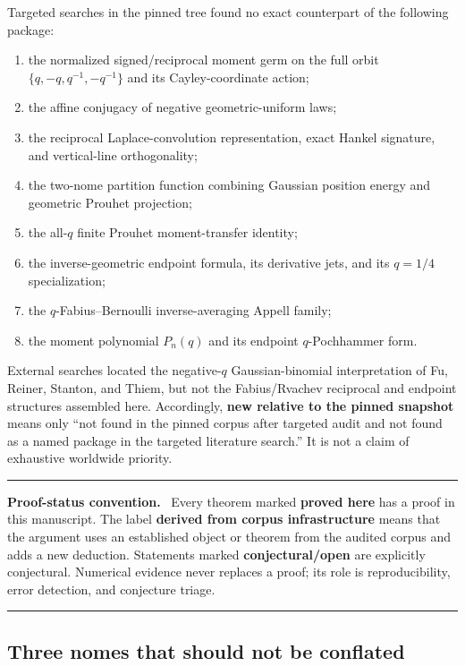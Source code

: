 \documentclass[11pt,oneside]{article}
\numberwithin{equation}{section}
\theoremstyle{definition}
\theoremstyle{remark}
\newcommand{\proved}{\textcolor{deepgreen}{\textbf{proved here}}}
\newcommand{\derived}{\textcolor{linkblue}{\textbf{derived from corpus infrastructure}}}
\newcommand{\openstatus}{\textcolor{deepred}{\textbf{conjectural/open}}}
\newcommand{\auditnew}{\textcolor{deepviolet}{\textbf{new relative to the pinned snapshot}}}
\newenvironment{statusbox}[1]{%
  \par\medskip\noindent\begin{center}\begin{minipage}{0.94\textwidth}%
  \color{linkblue}\hrule\vspace{0.65em}%
  \color{black}\textbf{\color{linkblue}#1.}\ }{%
  \par\vspace{0.65em}\color{linkblue}\hrule
  \end{minipage}\end{center}\medskip}
\begin{document}
Targeted searches in the pinned tree found no exact counterpart of the
following package:
\begin{enumerate}
\item the normalized signed/reciprocal moment germ on the full orbit
      $\{q,-q,q^{-1},-q^{-1}\}$ and its Cayley-coordinate action;
\item the affine conjugacy of negative geometric-uniform laws;
\item the reciprocal Laplace-convolution representation, exact Hankel
      signature, and vertical-line orthogonality;
\item the two-nome partition function combining Gaussian position energy and
      geometric Prouhet projection;
\item the all-$q$ finite Prouhet moment-transfer identity;
\item the inverse-geometric endpoint formula, its derivative jets, and its
      $q=1/4$ specialization;
\item the $q$-Fabius--Bernoulli inverse-averaging Appell family;
\item the moment polynomial $P_n(q)$ and its endpoint $q$-Pochhammer form.
\end{enumerate}
External searches located the negative-$q$ Gaussian-binomial interpretation of
Fu, Reiner, Stanton, and Thiem, but not the Fabius/Rvachev reciprocal and
endpoint structures assembled here.  Accordingly, \auditnew{} means only
``not found in the pinned corpus after targeted audit and not found as a named
package in the targeted literature search.''  It is not a claim of exhaustive
worldwide priority.

\begin{statusbox}{Proof-status convention}
Every theorem marked \proved{} has a proof in this manuscript.  The label
\derived{} means that the argument uses an established object or theorem from
the audited corpus and adds a new deduction.  Statements marked
\openstatus{} are explicitly conjectural.  Numerical evidence never replaces
a proof; its role is reproducibility, error detection, and conjecture triage.
\end{statusbox}

\subsection{Three nomes that should not be conflated}
\end{document}
